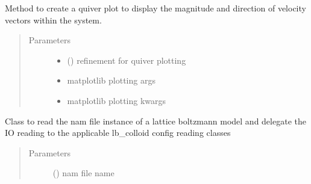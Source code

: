 \documentclass[letterpaper,10pt,english]{sphinxmanual}
\begin{document}
\begin{fulllineitems}
\begin{fulllineitems}
\begin{quote}
\begin{description}
\end{description}\end{quote}

\end{fulllineitems}


\begin{fulllineitems}
\label{\detokenize{index:lb_colloids.Colloids.Colloid_output.ModelPlot.plot_velocity_magnitude}}
Method to create a quiver plot to display the
magnitude and direction of velocity vectors within
the system.
\begin{quote}\begin{description}
\item[{Parameters}] \leavevmode\begin{itemize}
\item {} 
 () \textendash{} refinement for quiver plotting

\item {} 
 \textendash{} 
matplotlib plotting args


\item {} 
 \textendash{} 
matplotlib plotting kwargs


\end{itemize}

\end{description}\end{quote}

\end{fulllineitems}


\end{fulllineitems}

\label{\detokenize{index:module-lb_colloids.nam_file}}

\begin{fulllineitems}
\label{\detokenize{index:lb_colloids.nam_file.NamFile}}
Class to read the nam file instance of
a lattice boltzmann model and delegate the IO
reading to the applicable lb\_colloid config
reading classes
\begin{quote}\begin{description}
\item[{Parameters}] \leavevmode
{} () \textendash{} nam file name

\end{description}\end{quote}

\end{fulllineitems}
\end{document}
